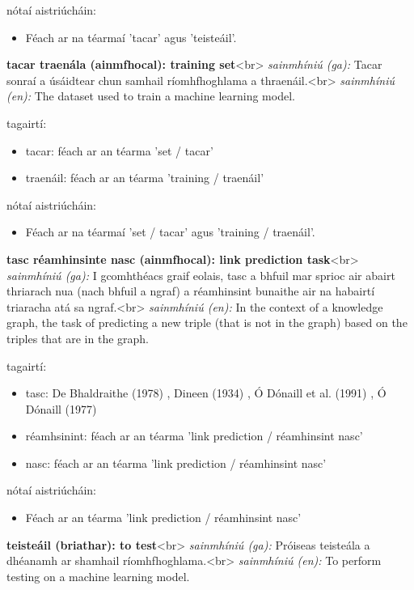 \documentclass{article}
\begin{document}
nótaí aistriúcháin:
\begin{itemize}
	\item Féach ar na téarmaí 'tacar' agus 'teisteáil'.
\end{itemize}


\textbf{tacar traenála (ainmfhocal): training set}<br>
\textit{sainmhíniú (ga):} Tacar sonraí a úsáidtear chun samhail ríomhfhoghlama a thraenáil.<br>
\textit{sainmhíniú (en):} The dataset used to train a machine learning model.

tagairtí:
\begin{itemize}
	\item tacar: féach ar an téarma 'set / tacar'
	\item traenáil: féach ar an téarma 'training / traenáil'
\end{itemize}

nótaí aistriúcháin:
\begin{itemize}
	\item Féach ar na téarmaí 'set / tacar' agus 'training / traenáil'.
\end{itemize}


\textbf{tasc réamhinsinte nasc (ainmfhocal): link prediction task}<br>
\textit{sainmhíniú (ga):} I gcomhthéacs graif eolais, tasc a bhfuil mar sprioc air abairt thriarach nua (nach bhfuil a ngraf) a réamhinsint bunaithe air na habairtí triaracha atá sa ngraf.<br>
\textit{sainmhíniú (en):} In the context of a knowledge graph, the task of predicting a new triple (that is not in the graph) based on the triples that are in the graph.

tagairtí:
\begin{itemize}
	\item tasc: De Bhaldraithe (1978) \cite{de-bhaldraithe}, Dineen (1934) \cite{dineen}, Ó Dónaill et al. (1991) \cite{focloir-beag}, Ó Dónaill (1977) \cite{odonaill}
	\item réamhsinint: féach ar an téarma 'link prediction / réamhinsint nasc'
	\item nasc: féach ar an téarma 'link prediction / réamhinsint nasc'
\end{itemize}

nótaí aistriúcháin:
\begin{itemize}
	\item Féach ar an téarma 'link prediction / réamhinsint nasc'
\end{itemize}


\textbf{teisteáil (briathar): to test}<br>
\textit{sainmhíniú (ga):} Próiseas teisteála a dhéanamh ar shamhail ríomhfhoghlama.<br>
\textit{sainmhíniú (en):} To perform testing on a machine learning model.
\end{document}
